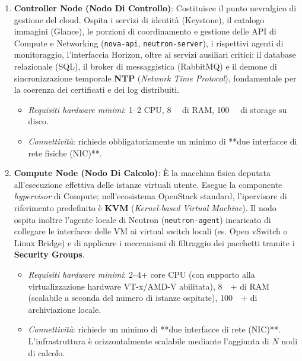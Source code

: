 \documentclass[11pt, a4paper]{article}
\begin{document}
\begin{enumerate}
    \item \textbf{Controller Node (Nodo Di Controllo)}:
    Costituisce il punto nevralgico di gestione del cloud. Ospita i servizi di identità (Keystone), il catalogo immagini (Glance), le porzioni di coordinamento e gestione delle API di Compute e Networking (\texttt{nova-api}, \texttt{neutron-server}), i rispettivi agenti di monitoraggio, l'interfaccia Horizon, oltre ai servizi ausiliari critici: il database relazionale (SQL), il broker di messaggistica (RabbitMQ) e il demone di sincronizzazione temporale \textbf{NTP} (\emph{Network Time Protocol}), fondamentale per la coerenza dei certificati e dei log distribuiti.
    \begin{itemize}[noitemsep]
        \item \emph{Requisiti hardware minimi}: 1--2 CPU, \SI{8}{\giga\byte} di RAM, \SI{100}{\giga\byte} di storage su disco.
        \item \emph{Connettività}: richiede obbligatoriamente un minimo di **due interfacce di rete fisiche (NIC)**.
    \end{itemize}

    \item \textbf{Compute Node (Nodo Di Calcolo)}:
    È la macchina fisica deputata all'esecuzione effettiva delle istanze virtuali utente. Esegue la componente \emph{hypervisor} di Compute; nell'ecosistema OpenStack standard, l'ipervisore di riferimento predefinito è \textbf{KVM} (\emph{Kernel-based Virtual Machine}). Il nodo ospita inoltre l'agente locale di Neutron (\texttt{neutron-agent}) incaricato di collegare le interfacce delle VM ai virtual switch locali (es. Open vSwitch o Linux Bridge) e di applicare i meccanismi di filtraggio dei pacchetti tramite i \textbf{Security Groups}.
    \begin{itemize}[noitemsep]
        \item \emph{Requisiti hardware minimi}: 2--4+ core CPU (con supporto alla virtualizzazione hardware VT-x/AMD-V abilitata), \SI{8}{\giga\byte}+ di RAM (scalabile a seconda del numero di istanze ospitate), \SI{100}{\giga\byte}+ di archiviazione locale.
        \item \emph{Connettività}: richiede un minimo di **due interfacce di rete (NIC)**. L'infrastruttura è orizzontalmente scalabile mediante l'aggiunta di $N$ nodi di calcolo.
    \end{itemize}


\end{enumerate}
\end{document}
